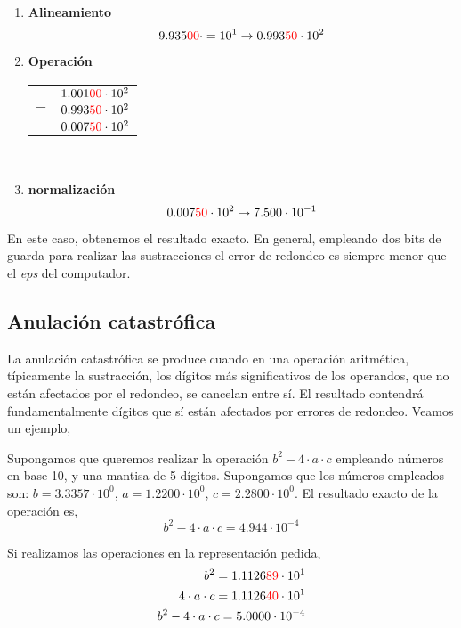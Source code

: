 \begin{enumerate}
\item \textbf{Alineamiento}
\begin{equation*}
9.935{\color{red}00}\cdot=10^1\rightarrow 0.993{\color{red}50} \cdot 10^2
\end{equation*}

\item \textbf{Operación}
\begin{tabular}{c r}
&$1.001{\color{red}00} \cdot10^2$\\
$-$&$0.993{\color{red}50}\cdot10^2$\\
\hline
&$0.007{\color{red}50}\cdot10^2$
\end{tabular}\\

\item \textbf{normalización}
\begin{equation*}
0.007{\color{red}50}\cdot10^2\rightarrow 7.500\cdot10^{-1}
\end{equation*}

\end{enumerate}
En este caso, obtenemos el resultado exacto. En general, empleando dos bits de guarda para realizar las sustracciones el error de redondeo es siempre menor que el \emph{eps} del computador.


\subsection{Anulación catastrófica}
La anulación catastrófica se produce cuando en una operación aritmética, típicamente la sustracción,  los dígitos más significativos de los operandos, que no están afectados por el redondeo, se cancelan entre sí. El resultado contendrá fundamentalmente dígitos que sí están afectados por errores de redondeo. Veamos un ejemplo,

Supongamos que queremos realizar la operación $b^2-4\cdot a \cdot c$ empleando números en base 10, y una mantisa de 5 dígitos. Supongamos que los números empleados son: $b= 3.3357\cdot10^0$, $a=1.2200\cdot10^0$, $c=2.2800\cdot10^0$. El resultado exacto de la operación es,
\begin{equation}
b^2-4\cdot a\cdot c=4.944\cdot10^{-4}
\end{equation}

Si realizamos las operaciones en la representación pedida,
\begin{align*}
b^2=1.1126{\color{red}89}\cdot10^1\\
4\cdot a\cdot c=1.1126{\color{red}40}\cdot10^1\\
b^2-4\cdot a\cdot c=5.0000\cdot10^{-4}
\end{align*}

